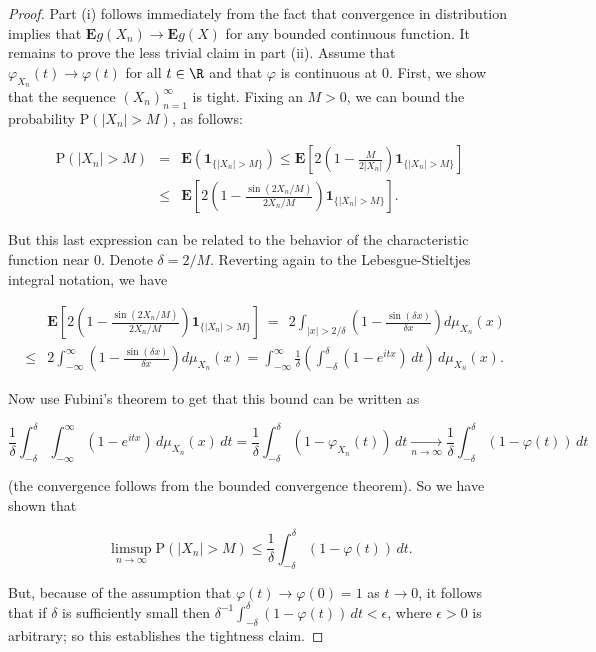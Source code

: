 \begin{proof}
Part (i) follows immediately from the fact that
convergence in distribution implies that
$\mathbf{E} g(X_n)\to \mathbf{E} g(X)$ for any
bounded continuous function. It remains to prove the
less trivial claim in part (ii). Assume that
$\varphi_{X_n}(t)\to \varphi(t)$ for all $t\in\R$ and
that $\varphi$ is continuous at $0$. First, we show
that the sequence $(X_n)_{n=1}^\infty$ is tight.
Fixing an $M>0$, we can bound the probability
$\mathrm{P}(|X_n|>M)$, as follows:

\begin{eqnarray*} \mathrm{P}(|X_n|>M) &=& \mathbf{E}\left( \mathbf{1}_{\{|X_n|>M\}}\right) \le
\mathbf{E} \left[ 2 \left( 1-\frac{M}{2|X_n|} \right) \mathbf{1}_{\{|X_n|>M\}}\right] \\
&\le&
\mathbf{E} \left[ 2 \left( 1-\frac{\sin(2X_n/M)}{2X_n/M} \right) \mathbf{1}_{\{|X_n|>M\}}\right].
\end{eqnarray*}

\noindent But this last expression can be related to the
behavior of the characteristic function near $0$.
Denote $\delta=2/M$. Reverting again to the
Lebesgue-Stieltjes integral notation, we have

\begin{eqnarray*}
&&\mathbf{E} \left[ 2 \left( 1-\frac{\sin(2X_n/M)}{2X_n/M} \right) \mathbf{1}_{\{|X_n|>M\}}\right]
 \ =\ \  2\int_{|x|>2/\delta} \left(1-\frac{\sin (\delta x)}{\delta x}\right) d\mu_{X_n}(x) \\
&\le& 2\int_{-\infty}^\infty \left(1-\frac{\sin (\delta x)}{\delta x}\right) d\mu_{X_n}(x)
= \int_{-\infty}^\infty \frac{1}{\delta}\left(\int_{-\delta}^\delta (1-e^{itx})\,dt\right)\,d\mu_{X_n}(x).
\end{eqnarray*}

\noindent Now use Fubini's theorem to get that this bound can
be written as

\[
\frac{1}{\delta} \int_{-\delta}^\delta \int_{-\infty}^\infty (1-e^{itx})\,d\mu_{X_n}(x)\,dt
=\frac{1}{\delta} \int_{-\delta}^\delta (1-\varphi_{X_n}(t))\,dt
\xrightarrow[n\to\infty]{} \frac{1}{\delta} \int_{-\delta}^\delta (1-\varphi(t))\,dt
\]

\noindent (the convergence follows from the bounded convergence
theorem). So we have shown that

\[
\limsup_{n\to\infty} \mathrm{P}(|X_n|>M) \le \frac{1}{\delta} \int_{-\delta}^\delta (1-\varphi(t))\,dt.
\]

\noindent But, because of the assumption that
$\varphi(t)\to \varphi(0)=1$ as $t\to 0$, it follows
that if $\delta$ is sufficiently small then
$\delta^{-1} \int_{-\delta}^\delta (1-\varphi(t))\,dt
< \epsilon$,
where $\epsilon>0$ is arbitrary; so this establishes
the tightness claim.


\end{proof}
